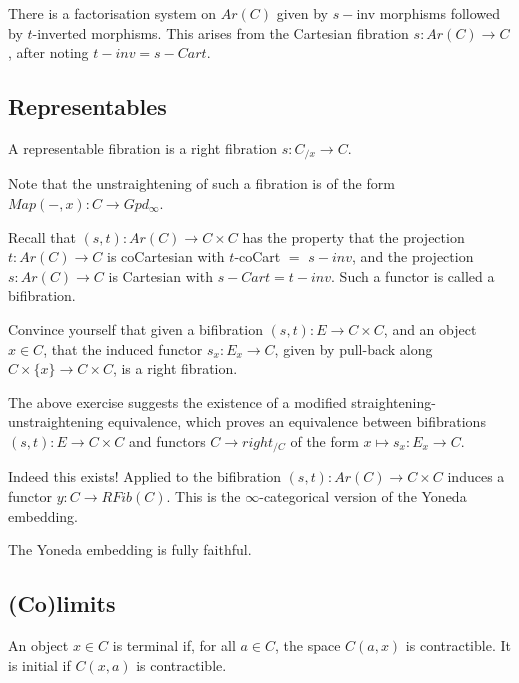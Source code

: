 \begin{example}
    There is a factorisation system on $Ar(C)$ given by $s-$inv morphisms followed by $t$-inverted morphisms. This arises from the Cartesian fibration $s:Ar(C)\rightarrow C$, after noting $t-inv=s-Cart$.
\end{example}

\subsection{Representables}
\begin{definition}
    A representable fibration is a right fibration $s:C_{/x}\rightarrow C$.
\end{definition}

Note that the unstraightening of such a fibration is of the form $Map(-,x):C\rightarrow Gpd_\infty$.

Recall that $(s,t):Ar(C)\rightarrow C\times C$ has the property that the projection $t:Ar(C)\rightarrow C$ is coCartesian with $t$-coCart $=$ $s-inv$, and the projection $s:Ar(C)\rightarrow C$ is Cartesian with $s-Cart = t-inv.$ Such a functor is called a bifibration.

\begin{exercise}
    Convince yourself that given a bifibration $(s,t):E\rightarrow C\times C$, and an object $x\in C$, that the induced functor $s_x:E_x\rightarrow C$, given by pull-back along $C\times \{x\}\rightarrow C\times C$, is a right fibration.
\end{exercise}

The above exercise suggests the existence of a modified straightening-unstraightening equivalence, which proves an equivalence between bifibrations $(s,t):E\rightarrow C\times C$ and functors $C\rightarrow right_{/C}$ of the form $x\mapsto s_x:E_x\rightarrow C$.

Indeed this exists! Applied to the bifibration $(s,t):Ar(C)\rightarrow C\times C$ induces a functor $y:C\rightarrow RFib(C)$. This is the $\infty$-categorical version of the Yoneda embedding.

\begin{proposition}
    The Yoneda embedding is fully faithful.
\end{proposition}

\subsection{(Co)limits}
\begin{definition}
    An object $x\in C$ is terminal if, for all $a\in C$, the space $C(a,x)$ is contractible. It is initial if $C(x,a)$ is contractible.
\end{definition}

